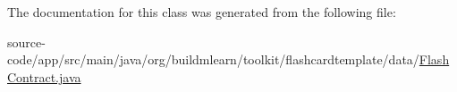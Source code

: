 The documentation for this class was generated from the following file\+:\begin{DoxyCompactItemize}
\item 
source-\/code/app/src/main/java/org/buildmlearn/toolkit/flashcardtemplate/data/\hyperlink{FlashContract_8java}{Flash\+Contract.\+java}\end{DoxyCompactItemize}
